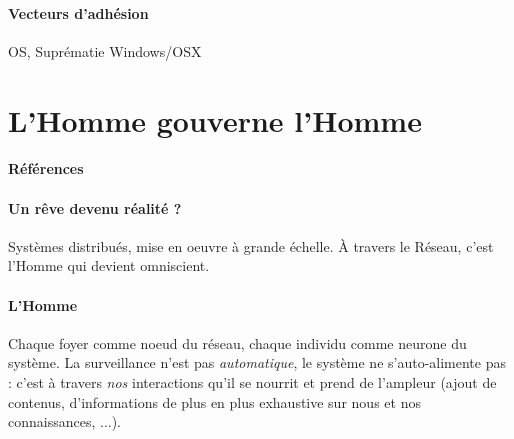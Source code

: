 \paragraph{Vecteurs d'adhésion} OS, Suprématie Windows/OSX


\section{L'Homme gouverne l'Homme}
\paragraph{Références} \cite{GhostInTheShell}

\paragraph{Un rêve devenu réalité ?} Systèmes distribués, mise en oeuvre à grande échelle.
À travers le Réseau, c'est l'Homme qui devient omniscient.

\paragraph{L'Homme} Chaque foyer comme noeud du réseau, chaque individu comme neurone du
système. La surveillance n'est pas \emph{automatique}, le système ne s'auto-alimente pas :
c'est à travers \emph{nos} interactions qu'il se nourrit et prend de l'ampleur (ajout de 
contenus, d'informations de plus en plus exhaustive sur nous et nos connaissances, ...).